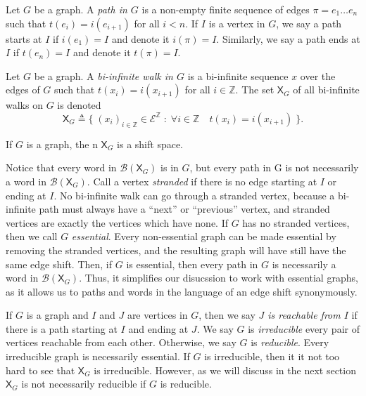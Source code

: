\documentclass[hidelinks]{article}
\newcommand{\Ec}{\mathcal{E}}
\newcommand{\Bc}{\mathcal{B}}
\newcommand{\shift}[1]{\mathsf{X}_{#1}}
\newcommand{\term}[1]{\textit{#1}}
\theoremstyle{definition}
\begin{document}
\begin{definition}
    Let \(G\) be a graph. A \term{path in \(G\)} is a non-empty finite sequence of edges \(\pi = e_1 \dots e_n\) such that \(t(e_i) = i(e_{i+1})\) for all \(i < n\).
    If \(I\) is a vertex in \(G\), we say a path starts at \(I\) if \(i(e_1) = I\) 
    and denote it \(i(\pi) = I\). Similarly, 
    we say a path ends at \(I\) if \(t(e_n) = I\) and denote it \(t(\pi) = I\).
\end{definition}

\begin{definition}
    Let \(G\) be a graph. A \term{bi-infinite walk in \(G\)} is 
    a bi-infinite sequence \(x\) over the edges of \(G\) such that \(t(x_i) = i(x_{i+1})\)
    for all \(i \in \mathbb{Z}\).
    The set \(\shift{G}\) of all bi-infinite 
    walks on \(G\) is denoted
    \[\shift{G} \triangleq \Big\{ \; (x_i)_{i \in \mathbb{Z}} \in \Ec^\mathbb{Z} \; : \; \forall i \in \mathbb{Z} \quad t(x_i) = i(x_{i+1}) \; \Big\}. \]
\end{definition}

\begin{theorem}[name=\cite{lind1995introduction}]
    If \(G\) is a graph, the n \(\shift{G}\) is a shift space.
\end{theorem}

Notice that every word in \(\Bc(\shift{G})\) is in \(G\), but every path in G is 
not necessarily a word in \(\Bc(\shift{G})\). Call a vertex \term{stranded} if 
there is no edge starting at \(I\) or  ending at \(I\). No bi-infinite walk can go 
through a stranded vertex, because a bi-infinite path must always have a ``next''
or ``previous'' vertex, and stranded vertices are exactly the vertices which have none.
If \(G\) has no stranded vertices, then we call \(G\) \term{essential}. Every 
non-essential graph can be made essential by removing the stranded vertices, and 
the resulting graph will have still have the same edge shift. Then, if \(G\) 
is essential, then every path in \(G\) is necessarily a word in \(\Bc(\shift{G})\). 
Thus, it simplifies our disucssion to work with essential graphs, as 
it allows us to paths and words in the language of an edge shift synonymously. 

If \(G\) is a graph and \(I\) and \(J\)
are vertices in \(G\), then we say \term{\(J\) is reachable from \(I\)}
if there is a path starting at \(I\) and ending at \(J\). We say \(G\) is \term{irreducible}
every pair of vertices reachable from each other. Otherwise, we say \(G\) is \term{reducible}. 
Every irreducible graph is necessarily essential. If \(G\) is irreducible, then 
it it not too hard to see that \(\shift{G}\) is irreducible. However, 
as we will discuss in the next section \(\shift{G}\) is not necessarily reducible 
if \(G\) is reducible.
\end{document}
